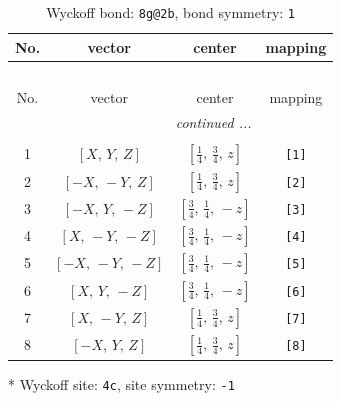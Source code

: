 \documentclass[fleqn,8pt]{jsarticle}
\begin{document}
\renewcommand{\arraystretch}{1.2}
\begin{longtable}{cccc}
\caption{Wyckoff bond: {\tt 8g@2b}, bond symmetry: {\tt 1}}
 \\
 \hline \hline
No. & vector & center & mapping \\ \hline \endfirsthead

\multicolumn{3}{l}{\tablename\ \thetable{}} \\
 \hline \hline
No. & vector & center & mapping \\ \hline \endhead

 \hline \hline
\multicolumn{3}{r}{\footnotesize\it continued ...} \\ \endfoot

 \hline \hline
\multicolumn{3}{r}{} \\ \endlastfoot

1 & $\left[ X,\, Y,\, Z \right]$ & $\left[ \frac{1}{4},\, \frac{3}{4},\, z \right]$ & {\tt [1]} \\ \hline
2 & $\left[ - X,\, - Y,\, Z \right]$ & $\left[ \frac{1}{4},\, \frac{3}{4},\, z \right]$ & {\tt [2]} \\ \hline
3 & $\left[ - X,\, Y,\, - Z \right]$ & $\left[ \frac{3}{4},\, \frac{1}{4},\, - z \right]$ & {\tt [3]} \\ \hline
4 & $\left[ X,\, - Y,\, - Z \right]$ & $\left[ \frac{3}{4},\, \frac{1}{4},\, - z \right]$ & {\tt [4]} \\ \hline
5 & $\left[ - X,\, - Y,\, - Z \right]$ & $\left[ \frac{3}{4},\, \frac{1}{4},\, - z \right]$ & {\tt [5]} \\ \hline
6 & $\left[ X,\, Y,\, - Z \right]$ & $\left[ \frac{3}{4},\, \frac{1}{4},\, - z \right]$ & {\tt [6]} \\ \hline
7 & $\left[ X,\, - Y,\, Z \right]$ & $\left[ \frac{1}{4},\, \frac{3}{4},\, z \right]$ & {\tt [7]} \\ \hline
8 & $\left[ - X,\, Y,\, Z \right]$ & $\left[ \frac{1}{4},\, \frac{3}{4},\, z \right]$ & {\tt [8]} \\
\end{longtable}
* Wyckoff site: {\tt 4c}, site symmetry: {\tt -1}
\renewcommand{\arraystretch}{1.2}
\end{document}
